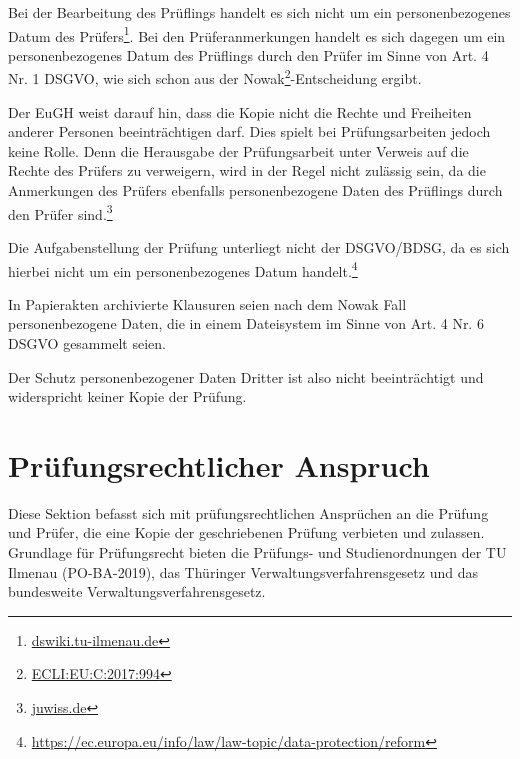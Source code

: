 \documentclass[12pt, a4paper]{article}
\begin{document}
Bei der Bearbeitung des Prüflings handelt es sich nicht um ein personenbezogenes Datum des Prüfers\footnote{\href{https://dswiki.tu-ilmenau.de/wiki/user/martin_neldner/recht_auf_kopie_bei_pruefungsleistungen}{dswiki.tu-ilmenau.de}}.
Bei den Prüferanmerkungen handelt es sich dagegen um ein personenbezogenes Datum des Prüflings durch den Prüfer im Sinne von Art. 4 Nr. 1 DSGVO, wie sich schon aus der Nowak\footnote{\href{http://curia.europa.eu/juris/document/document.jsf;jsessionid=9ea7d0f130d5caea7f77b3784786a1dae42a55d82693.e34KaxiLc3eQc40LaxqMbN4PaNuKe0?text=&docid=198059&pageIndex=0&doclang=DE&mode=lst&dir=&occ=first&part=1&cid=1135575}{ECLI:EU:C:2017:994}}-Entscheidung ergibt.

Der EuGH weist darauf hin, dass die Kopie nicht die Rechte und Freiheiten anderer Personen beeinträchtigen darf. Dies spielt bei Prüfungsarbeiten jedoch keine Rolle. Denn die Herausgabe der Prüfungsarbeit unter Verweis auf die Rechte des Prüfers zu verweigern, wird in der Regel nicht zulässig sein, da die Anmerkungen des Prüfers ebenfalls personenbezogene Daten des Prüflings durch den Prüfer sind.\footnote{\href{https://www.juwiss.de/8-2018/}{juwiss.de}}

Die Aufgabenstellung der Prüfung unterliegt nicht der DSGVO/BDSG, da es sich hierbei nicht um ein personenbezogenes Datum handelt.\footnote{\href{https://ec.europa.eu/info/law/law-topic/data-protection/reform/what-personal-data_de}{https://ec.europa.eu/info/law/law-topic/data-protection/reform}}

In Papierakten archivierte Klausuren seien nach dem Nowak Fall personenbezogene Daten, die in einem Dateisystem im Sinne von Art. 4 Nr. 6 DSGVO gesammelt seien. 

Der Schutz personenbezogener Daten Dritter ist also nicht beeinträchtigt und widerspricht keiner Kopie der Prüfung.


\section{Prüfungsrechtlicher Anspruch}
Diese Sektion befasst sich mit prüfungsrechtlichen Ansprüchen an die Prüfung und Prüfer, die eine Kopie der geschriebenen Prüfung verbieten und zulassen. Grundlage für Prüfungsrecht bieten die Prüfungs- und Studienordnungen der TU Ilmenau (PO-BA-2019), das Thüringer Verwaltungsverfahrensgesetz und das bundesweite Verwaltungsverfahrensgesetz.
\end{document}
